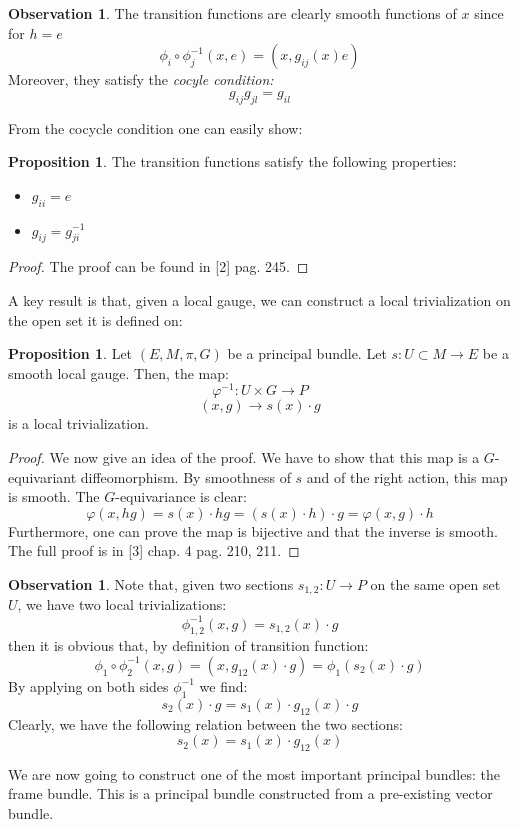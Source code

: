\documentclass[12pt,a4paper]{report}
\theoremstyle{definition}
\theoremstyle{Theorem}
\newtheorem{Prop}[Def]{Proposition}
\theoremstyle{definition}
\theoremstyle{definition}
\newtheorem{Obs}[Def]{Observation}
\begin{document}
	\begin{Obs}\label{Obs_3.5.2}
		The transition functions are clearly smooth functions of $x$ since for $h=e$
		$$\phi_i\circ\phi^{-1}_j(x,e)=(x,g_{ij}(x)e)$$
		Moreover, they satisfy the \textit{cocyle condition:}
		$$g_{ij}g_{jl}=g_{il}$$
	\end{Obs}
	From the cocycle condition one can easily show:
	\begin{Prop}
		The transition functions satisfy the following properties:
		\begin{itemize}
			\item $g_{ii}=e$
			\item $g_{ij}=g_{ji}^{-1}$
		\end{itemize}
	\end{Prop}
	\begin{proof}
		The proof can be found in [2] pag. 245.
	\end{proof}
	A key result is that, given a local gauge, we can construct a local trivialization on the open set it is defined on:
	\begin{Prop}\label{Prop_3.5.3}
		Let $(E,M,\pi,G)$ be a principal bundle. Let $s:U\subset M\rightarrow E$ be a smooth local gauge. Then, the map:
		$$\varphi^{-1}: U\times G\rightarrow P$$
		$$(x,g)\rightarrow s(x)\cdot g$$
		is a local trivialization.
	\end{Prop}
	\begin{proof}
		We now give an idea of the proof.
		We have to show that this map is a $G$-equivariant diffeomorphism. By smoothness of $s$ and of the right action, this map is smooth. The $G$-equivariance is clear:
		$$\varphi(x,hg)=s(x)\cdot hg=(s(x)\cdot h)\cdot g=\varphi(x,g)\cdot h$$
		Furthermore, one can prove the map is bijective and that the inverse is smooth. The full proof is in [3] chap. 4 pag. 210, 211.
	\end{proof}
	\begin{Obs}\label{Obs_3.5.3}
		Note that, given two sections $s_{1,2}:U\rightarrow P$ on the same open set $U$, we have two local trivializations:
		$$\phi^{-1}_{1,2}(x,g)=s_{1,2}(x)\cdot g$$
		then it is obvious that, by definition of transition function: 
		$$\phi_1\circ\phi_2^{-1}(x,g)=(x,g_{12}(x)\cdot g)=\phi_1(s_{2}(x)\cdot g)$$
		By applying on both sides $\phi_1^{-1}$ we find:
		$$s_2(x)\cdot g=s_1(x)\cdot g_{12}(x)\cdot g$$
		Clearly, we have the following relation between the two sections:
		$$s_2(x)=s_1(x)\cdot g_{12}(x)$$
	\end{Obs}
	We are now going to construct one of the most important principal bundles: the frame bundle. This is a principal bundle constructed from a pre-existing vector bundle.
\end{document}
